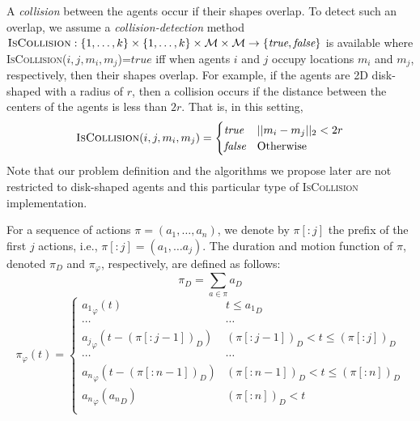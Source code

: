 \documentclass[review]{elsarticle}
\newcommand{\true}{\textit{true}\xspace}
\newcommand{\false}{\textit{false}\xspace}
\newcommand{\iscollision}{\textsc{IsCollision}\xspace}
\begin{document}
A \emph{collision} between the agents occur if their shapes overlap. To detect such an overlap, we assume a \emph{collision-detection} method $\iscollision:\{1,\ldots,k\}\times \{1,\ldots,k\}
\times \mathcal{M}\times \mathcal{M}
\rightarrow \{\true,\false\}$ 
is available where \iscollision($i,j,m_i,m_j$)=$\true$ iff when agents $i$ and $j$ occupy locations $m_i$ and $m_j$, respectively, then their shapes overlap. For example, if the agents are 2D disk-shaped with a radius of $r$, then a collision occurs if the distance between the centers of the agents is less than $2r$. That is, in this setting, 
\begin{equation}
\iscollision(i,j, m_i,m_j)=
\begin{cases}
\true & ||m_i-m_j||_2 < 2r \\
\false & \text{Otherwise}
\end{cases}
\end{equation}
Note that our problem definition and the algorithms we propose later are not restricted to disk-shaped agents and this particular type of \iscollision implementation. 


For a sequence of actions $\pi=(a_1,\ldots, a_n)$, 
we denote by $\pi[:j]$ the prefix of the first $j$ actions, i.e., 
$\pi[:j]=(a_1,\ldots a_j)$. The duration and motion function of $\pi$, denoted 
$\pi_D$ and $\pi_\varphi$, respectively, are defined as follows: 
\begin{equation}
    \pi_D=\sum_{a\in\pi} a_D
\end{equation}
\begin{equation}
    \pi_\varphi(t)=
    \begin{cases}
        {a_1}_\varphi(t)  & t\leq {a_1}_D \\
        \cdots & \cdots  \\
        {a_j}_\varphi(t-(\pi[:j-1])_D) & (\pi[:j-1])_D < t \leq (\pi[:j])_D \\
        \cdots & \cdots  \\
        {a_n}_\varphi(t-(\pi[:n-1])_D) & (\pi[:n-1])_D < t \leq (\pi[:n])_D \\
        {a_n}_\varphi({a_n}_D) & (\pi[:n])_D < t \\
        
    \end{cases}
    \label{eq:motion}
\end{equation}
\end{document}
